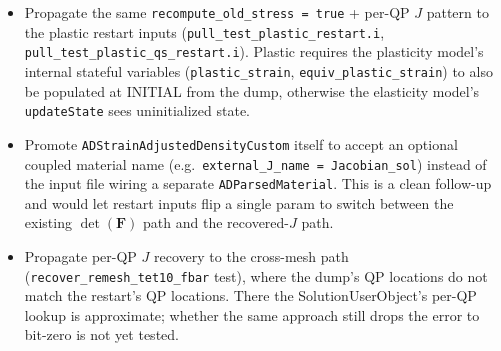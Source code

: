 \documentclass[11pt]{article}
\newcommand{\F}{\mathbf{F}}
\begin{document}
\begin{itemize}
\item Propagate the same \texttt{recompute\_old\_stress = true} + per-QP $J$ pattern to the plastic restart inputs (\texttt{pull\_test\_plastic\_restart.i}, \texttt{pull\_test\_plastic\_qs\_restart.i}). Plastic requires the plasticity model's internal stateful variables (\texttt{plastic\_strain}, \texttt{equiv\_plastic\_strain}) to also be populated at INITIAL from the dump, otherwise the elasticity model's \texttt{updateState} sees uninitialized state.
\item Promote \texttt{ADStrainAdjustedDensityCustom} itself to accept an optional coupled material name (e.g.\ \texttt{external\_J\_name = Jacobian\_sol}) instead of the input file wiring a separate \texttt{ADParsedMaterial}. This is a clean follow-up and would let restart inputs flip a single param to switch between the existing $\det(\F)$ path and the recovered-$J$ path.
\item Propagate per-QP $J$ recovery to the cross-mesh path (\texttt{recover\_remesh\_tet10\_fbar} test), where the dump's QP locations do not match the restart's QP locations. There the SolutionUserObject's per-QP lookup is approximate; whether the same approach still drops the error to bit-zero is not yet tested.
\end{itemize}
\end{document}
